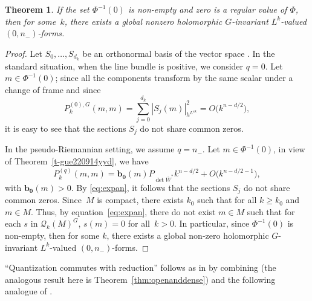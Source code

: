 \documentclass[pdftex]{sigma}
\numberwithin{equation}{section}
\newtheorem{Theorem}{Theorem}[section]
\begin{document}
 	\begin{Theorem}\label{thm:2}
 		If the set $\Phi^{-1}(0)$ is non-empty and zero is a regular value of $\Phi$, then for some~$k$, there exists a global nonzero holomorphic $G$-invariant $L^k$-valued $(0, n_-)$-forms.
 	\end{Theorem}
	\begin{proof}
		Let $S_0, \dots, S_{d_k}$ be an orthonormal basis of the vector space . In the standard situation, when the line bundle is positive, we consider $q=0$. Let $m \in \Phi^{-1}(0)$; since all the components transform by the same scalar under a change of frame and since
			\[P^{(0),G}_k(m, m) = \sum_{j=0}^{d_k} |S_j(m)|^2_{h^{L^{\otimes k}}}=O\bigl(k^{n-d/2}\bigr) , \]
		it is easy to see that the sections $S_j$ do not share common zeros.
		
		In the pseudo-Riemannian setting, we assume $q=n_-$. Let $m \in \Phi^{-1}(0)$, in view of Theorem~\ref{t-gue220914yyd}, we have
		\begin{equation} \label{eq:expan}
			P_k^{(q)}(m,m)= \mathbf{b_0}(m) P_{\det \overline{W}^*} k^{n-d/2} + O\bigl(k^{n-d/2-1}\bigr) ,
		\end{equation}
		with $\mathbf{b_0}(m)> 0$. By \eqref{eq:expan}, it follows that the sections $S_j$ do not share common zeros. Since~$M$ is compact, there exists $k_0$ such that  for all $k\geq k_0$ and $m\in M$. Thus, by equation~\eqref{eq:expan}, there do not exist $m\in M$ such that for each $s$ in $\mathcal{Q}_k(M)^G$, $s(m)=0$ for all~${k>0}$. In particular, since $\Phi^{-1}(0)$ is non-empty, then for some $k$, there exists a global non-zero holomorphic $G$-invariant $L^k$-valued $(0, n_-)$-forms.
	\end{proof}

	 ``Quantization commutes with reduction'' follows as in \cite{gs} by combining \cite[Theorem 5.7]{gs} (the analogous result here is Theorem~\ref{thm:openanddense}) and the following analogue of \cite[Theorem 5.8]{gs}.
	
\end{document}
